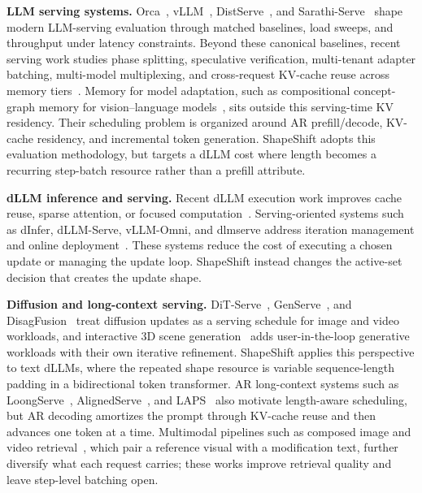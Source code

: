 \documentclass[a4paper]{llncs}
\begin{document}
\textbf{LLM serving systems.} Orca~\cite{orca2022}, vLLM~\cite{vllm2023}, DistServe~\cite{distserve2024}, and Sarathi-Serve~\cite{sarathi2024} shape modern LLM-serving evaluation through matched baselines, load sweeps, and throughput under latency constraints. Beyond these canonical baselines, recent serving work studies phase splitting, speculative verification, multi-tenant adapter batching, multi-model multiplexing, and cross-request KV-cache reuse across memory tiers~\cite{splitwise2023,specinfer2024,medusa2024,eagle2024,tetriinfer2024,punica2023,slora2023,muxserve2024,mcam2025}. Memory for model adaptation, such as compositional concept-graph memory for vision--language models~\cite{zhou2026comem}, sits outside this serving-time KV residency. Their scheduling problem is organized around AR prefill/decode, KV-cache residency, and incremental token generation. ShapeShift adopts this evaluation methodology, but targets a dLLM cost where length becomes a recurring step-batch resource rather than a prefill attribute.

\textbf{dLLM inference and serving.} Recent dLLM execution work improves cache reuse, sparse attention, or focused computation~\cite{zhao2025fastdllm,dllmcache2025,d2cache2025,dkvcache2025,sparsedllm2025,focuscompute2026,focusdllm2026}. Serving-oriented systems such as dInfer, dLLM-Serve, vLLM-Omni, and dlmserve address iteration management and online deployment~\cite{dInfer2025,dllmserve2025,vllmomni2026,dlmserve2026}. These systems reduce the cost of executing a chosen update or managing the update loop. ShapeShift instead changes the active-set decision that creates the update shape.

\textbf{Diffusion and long-context serving.} DiT-Serve~\cite{ditserve2025}, GenServe~\cite{genserve2026}, and DisagFusion~\cite{disagfusion2026} treat diffusion updates as a serving schedule for image and video workloads, and interactive 3D scene generation~\cite{li2026comprehensive} adds user-in-the-loop generative workloads with their own iterative refinement. ShapeShift applies this perspective to text dLLMs, where the repeated shape resource is variable sequence-length padding in a bidirectional token transformer. AR long-context systems such as LoongServe~\cite{loongserve2024}, AlignedServe~\cite{alignedserve2026}, and LAPS~\cite{laps2026} also motivate length-aware scheduling, but AR decoding amortizes the prompt through KV-cache reuse and then advances one token at a time. Multimodal pipelines such as composed image and video retrieval~\cite{encoder2025,offset2025,hud2025,pair2025}, which pair a reference visual with a modification text, further diversify what each request carries; these works improve retrieval quality and leave step-level batching open.
\end{document}
